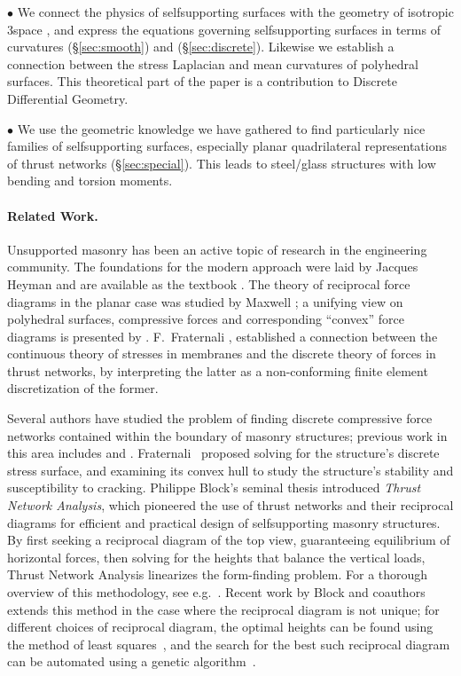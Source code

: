 \documentclass[review]{acmsiggraph}
\newcommand{\secref}[1]{(\S\ref{#1})}
\begin{document}
$\bullet$ We connect the physics of self\dash supporting surfaces with
the geometry of isotropic 3\dash space , and express the
equations governing self\dash supporting surfaces in terms of curvatures
\secref{sec:smooth} and \secref{sec:discrete}.
Likewise we establish a connection between the stress Laplacian and
mean curvatures of polyhedral surfaces. This theoretical part of the
paper is a contribution to Discrete Differential Geometry.


$\bullet$ We use the geometric knowledge we have gathered to 
find particularly nice families of self\dash supporting surfaces,
especially planar quadrilateral representations of thrust networks
\secref{sec:special}. This leads to steel\slash glass structures
with low bending and torsion moments.



\paragraph{Related Work.}

Unsupported masonry has been an active topic of research in the
engineering community. The foundations for the modern approach were laid
by Jacques Heyman  and are available as the textbook
\cite{Heyman95}. The theory of reciprocal force diagrams in the planar
case was studied by Maxwell \cite{Maxwell64};
a unifying view on polyhedral surfaces, compressive
forces and corresponding ``convex'' force diagrams is presented by
\cite{Ash1988}. F.~Fraternali ,
 established a connection between the continuous
theory of stresses in membranes and the discrete theory of forces in
thrust networks, by interpreting the latter as a non-conforming
finite element discretization of the former.

Several authors have studied the problem of finding discrete compressive
force networks contained within the boundary of masonry structures; previous
work in this area includes \cite{O'Dwyer98} and
\cite{andreu-2007}. Fraternali~ proposed solving
for the structure's discrete stress surface, and examining its convex hull
to study the structure's stability and susceptibility to cracking.
Philippe Block's seminal thesis introduced {\it Thrust
Network Analysis}, which pioneered the use of thrust networks and their
reciprocal diagrams for efficient and practical design of self\dash supporting
masonry structures. By first seeking a reciprocal diagram of the top view, guaranteeing equilibrium
of horizontal forces, then solving for the heights that balance the
vertical loads, Thrust Network Analysis linearizes the form-finding problem.
For a thorough overview of this methodology, see e.g.\ \cite{Block07,block09}.
Recent work by Block and coauthors extends this method in the case where the reciprocal diagram
is not unique; for different choices of reciprocal diagram, the optimal
heights can be found using the method of least squares~\cite{vanmele2011},
and the search for the best such reciprocal diagram can be automated using
a genetic algorithm~\cite{Block2011}.
\end{document}
